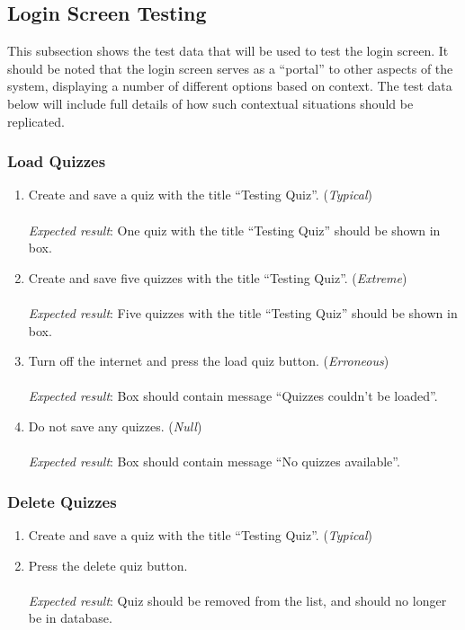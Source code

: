 \subsection{Login Screen Testing} %
\label{sub:login_screen_testing}
This subsection shows the test data that will be used to test the login screen. It should be noted that the login screen serves as a ``portal'' to other aspects of the system, displaying a number of different options based on context. The test data below will include full details of how such contextual situations should be replicated.

\subsubsection{Load Quizzes} %
\label{ssub:load_quizzes}
\begin{enumerate}[leftmargin=*]
\item Create and save a quiz with the title ``Testing Quiz''. (\textit{Typical})\\\\
\textit{Expected result}: One quiz with the title ``Testing Quiz'' should be shown in box.\\
\item Create and save five quizzes with the title ``Testing Quiz''. (\textit{Extreme})\\\\
\textit{Expected result}: Five quizzes with the title ``Testing Quiz'' should be shown in box.\\
\item Turn off the internet and press the load quiz button. (\textit{Erroneous})\\\\
\textit{Expected result}: Box should contain message ``Quizzes couldn't be loaded''.\\
\item Do not save any quizzes. (\textit{Null})\\\\
\textit{Expected result}: Box should contain message ``No quizzes available''.
\end{enumerate}

\subsubsection{Delete Quizzes} %
\label{ssub:delete_quizzes}
\begin{enumerate}[leftmargin=*]
\item Create and save a quiz with the title ``Testing Quiz''. (\textit{Typical})
\item Press the delete quiz button.\\\\
\textit{Expected result}: Quiz should be removed from the list, and should no longer be in database.
\end{enumerate}

